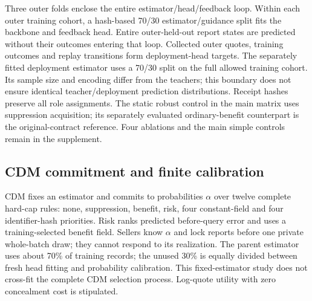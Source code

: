 Three outer folds enclose the entire estimator/head/feedback loop. Within
each outer training cohort, a hash-based 70/30 estimator/guidance split
fits the backbone and feedback head. Entire outer-held-out report states
are predicted without their outcomes entering that loop. Collected outer
quotes, training outcomes and replay transitions form deployment-head targets.
The separately fitted deployment estimator uses a 70/30 split on the full
allowed training cohort. Its sample size and encoding differ from the
teachers; this boundary does not ensure identical teacher/deployment
prediction distributions. Receipt hashes preserve all role assignments.
The static robust control in the main matrix uses suppression acquisition;
its separately evaluated ordinary-benefit counterpart is the original-contract
reference. Four ablations and the main simple controls remain in the supplement.

\subsection{CDM commitment and finite calibration}
\label{sec:cdm_commitment}
CDM fixes an estimator and commits to probabilities $\alpha$ over twelve
complete hard-cap rules: none, suppression, benefit, risk, four constant-field
and four identifier-hash priorities. Risk ranks predicted before-query error
and uses a training-selected benefit field. Sellers know $\alpha$ and lock
reports before one private whole-batch draw; they cannot respond to its
realization. The parent estimator uses about 70\% of training records; the
unused 30\% is equally divided between fresh head fitting and probability
calibration. This fixed-estimator study does not cross-fit the complete CDM
selection process. Log-quote utility with zero concealment cost is stipulated.


